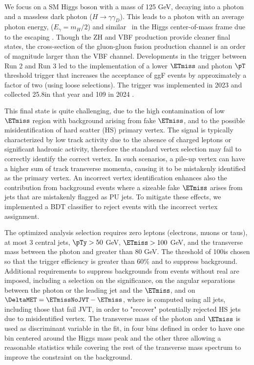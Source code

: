 We focus on a SM Higgs boson with a mass of 125 GeV, decaying into a photon and a massless dark photon ($H\to\gamma\gamma_{D}$). This leads to a photon with an average photon energy, ($E_\gamma=m_H/2$) and similar \ETmiss\ in the Higgs center-of-mass frame due to the escaping \gammad. Though the ZH and VBF production provide cleaner final states, the cross-section of the gluon-gluon fusion production channel is an order of magnitude larger than the VBF channel. Developments in the trigger between Run 2 and Run 3 led to the implementation of a lower $\ETmiss$ and photon $\pT$ threshold trigger that increases the acceptance of ggF events by approximately a factor of two (using loose selections). The trigger was implemented in 2023 and collected 25.8\fbinv in that year and 109 \fbinv in 2024 . 

This final state is quite challenging, due to the high contamination of low $\ETmiss$ region with background arising from fake $\ETmiss$, and to the possible misidentification of hard scatter (HS) primary vertex. The signal is typically characterized by low track activity due to the absence of charged leptons or significant hadronic activity, therefore the standard vertex selection may fail to correctly identify the correct vertex. In such scenarios, a pile-up vertex can have a higher sum of track transverse momenta, causing it to be mistakenly identified as the primary vertex. An incorrect vertex identification enhances also the contribution from background events where a sizeable fake $\ETmiss$ arises from jets that are mistakenly flagged as PU jets. To mitigate these effects, we implemented a BDT classifier to reject events with the incorrect vertex assignment. 

The optimized analysis selection requires zero leptons (electrons, muons or taus), at most 3 central jets, $\pTy > 50$ GeV, $\ETmiss > 100$ GeV, and the transverse mass between the photon and \ETmiss greater than 80 GeV. The threshold of 100\GeV is chosen so that the trigger efficiency is greater than 60\% and to suppress background. Additional requirements to suppress backgrounds from events without real \ETmiss are imposed, including a selection on the \ETmiss significance, on the angular separations between the photon or the leading jet and the $\ETmiss$, and on $\DeltaMET=\ETmissNoJVT-\ETmiss$, where \ETmissNoJVT is computed using all jets, including those that fail JVT, in order to "recover" potentially rejected HS jets due to misidentified vertex. The transverse mass of the photon and $\ETmiss$ is used as discriminant variable in the fit, in four bins defined in order to have one bin centered around the Higgs mass peak and the other three allowing a reasonable statistics while covering the rest of the transverse mass spectrum to improve the constraint on the background.  

